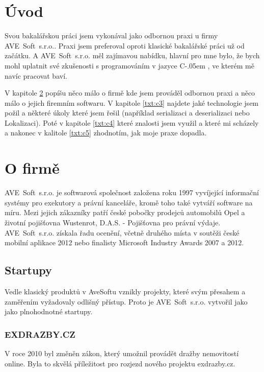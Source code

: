 \documentclass[czech,bachelorpractice,dept460,male,csharp]{diploma}
\newcommand{\AveSoft}{AVE~Soft~s.r.o.}
\newcommand{\Csharp}{%
  {\settoheight{\dimen0}{C}C\kern-.05em \resizebox{!}{\dimen0}{\raisebox{\depth}{\#}}}}
\begin{document}
\MakeTitlePages

\section{Úvod}
Svou bakalářskou práci jsem vykonával jako odbornou praxi u firmy \AveSoft. Praxi jsem preferoval oproti klasické bakalářské práci už od začátku. A {\AveSoft} měl zajímavou nabídku, hlavní pro mne bylo, že bych mohl uplatnit své zkušenosti s programováním v jazyce {\Csharp}, ve kterém mě navíc pracovat baví.

 V kapitole \ref{txt:c2} popíšu něco málo o firmě kde jsem prováděl odbornou praxi a něco málo o jejich firemním softwaru. V kapitole \ref{txt:c3} najdete jaké technologie jsem požil a některé úkoly které jsem řešil (například serializaci a deserializaci nebo Lokalizaci). Poté v kapitole \ref{txt:c4} které znalosti jsem využil a které mi scházely a nakonec v kalitole \ref{txt:c5} zhodnotím, jak moje praxe dopadla.
\section{O firmě}
\label{txt:c2}
	\AveSoft\cite{avesoftL} je softwarová společnost založena roku 1997 vyvíjející informační systémy pro exekutory a právní kanceláře, kromě toho také vytváří software na míru.
	Mezi jejich zákazníky patří české pobočky prodejců automobilů Opel a životní pojišťovna Wustenrot, D.A.S. - Pojišťovna pro právní výdaje.
	\AveSoft\cite{avesoft} získala řadu ocenění, včetně druhého místa v soutěži české mobilní aplikace 2012 nebo finalisty Microsoft Industry Awards 2007 a 2012.
	\subsection{Startupy}
	Vedle klasický produktů v AveSoftu vznikly projekty, které svým přesahem a zaměřením vyžadovaly odlišný přístup. Proto je {\AveSoft} vytvořil jako jako plnohodnotné startupy.
 		\subsubsection{EXDRAZBY.CZ}
 		V roce 2010 byl změněn zákon, který umožnil provádět dražby nemovitostí online. Byla to skvělá příležitost pro rozjezd nového projektu exdrazby.cz.
\end{document}
